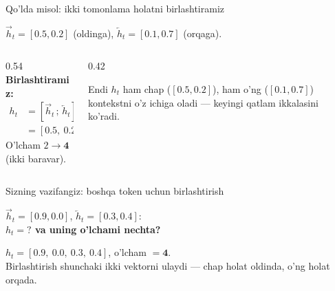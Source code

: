 \documentclass[aspectratio=169,11pt]{beamer}
\begin{document}
\begin{frame}{Qo'lda misol: ikki tomonlama holatni birlashtiramiz}
  \begin{tcolorbox}[defbox,title={Bir token, holat o'lchami 2}]
    \small $\overrightarrow{h}_t=[0.5, 0.2]$ (oldinga), \;
    $\overleftarrow{h}_t=[0.1, 0.7]$ (orqaga).
  \end{tcolorbox}
  \vspace{0.2em}
  \begin{columns}[T]
    \begin{column}{0.54\textwidth}
      \textbf{Birlashtiramiz:}
      \begin{align*}
        h_t &= [\overrightarrow{h}_t\,;\,\overleftarrow{h}_t]\\
            &= [0.5,\ 0.2,\ 0.1,\ 0.7]
      \end{align*}
      O'lcham $2\to \mathbf{4}$ (ikki baravar).
    \end{column}
    \begin{column}{0.42\textwidth}
      \begin{tcolorbox}[okbox,top=2pt,bottom=2pt]
        \footnotesize
        Endi $h_t$ ham chap ($[0.5,0.2]$), ham o'ng ($[0.1,0.7]$) kontekstni o'z
        ichiga oladi --- keyingi qatlam ikkalasini ko'radi.
      \end{tcolorbox}
    \end{column}
  \end{columns}
\end{frame}

\begin{frame}{Sizning vazifangiz: boshqa token uchun birlashtirish}
  \begin{tcolorbox}[warnbox,title=Savol --- 60 soniya]
    \small
    $\overrightarrow{h}_t=[0.9, 0.0]$, \; $\overleftarrow{h}_t=[0.3, 0.4]$:\\[4pt]
    \textbf{\large $h_t = ?$ \quad va uning o'lchami nechta?}
  \end{tcolorbox}
  \pause
  \begin{tcolorbox}[okbox,title=Javob]
    \small
    $h_t = [0.9,\ 0.0,\ 0.3,\ 0.4]$, \quad o'lcham $= \mathbf{4}$.\\[3pt]
    \footnotesize Birlashtirish shunchaki ikki vektorni ulaydi --- chap holat oldinda,
    o'ng holat orqada.
  \end{tcolorbox}
\end{frame}
\end{document}
